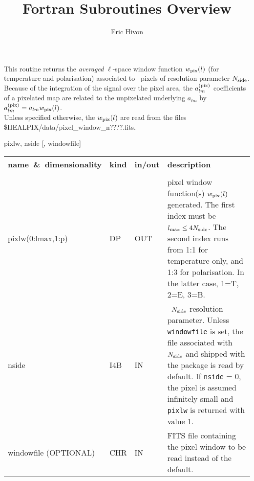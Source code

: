 
\sloppy


\title{\healpix Fortran Subroutines Overview}
 \section[pixel\_window]{ }
\label{sub:pixel_window}
\author{Eric Hivon}

\newcommand{\wpix}{w_{\rm pix}(\ell)}
\newcommand{\alm}{a_{lm}}
\newcommand{\almpix}{a_{lm}^{\rm (pix)}}

\begin{facility}
{This routine returns the {\em averaged} $\ell$-space window function $\wpix$ (for temperature and
  polarisation) associated to \healpix\
  pixels of resolution parameter ${N_{\rm side}}$. Because of the integration of the
signal over the
pixel area, the $\almpix$ coefficients of a pixelated map
are related to the unpixelated underlying $\alm$ by $\almpix = \alm \wpix$.\\
Unless specified otherwise, the $\wpix$ are read from the files
  \$HEALPIX/data/pixel\_window\_n????.fits.}
{\modAlmTools}
\end{facility}

\begin{f90format}
{pixlw, nside [, windowfile]}
\end{f90format}

\begin{arguments}
{
\begin{tabular}{p{0.30\hsize} p{0.05\hsize} p{0.05\hsize} p{0.50\hsize}} \hline  
\textbf{name~\&~dimensionality} & \textbf{kind} & \textbf{in/out} & \textbf{description} \\ \hline
                   &   &   &                           \\ %
pixlw(0:lmax,1:p) & DP & OUT & pixel window function(s) $\wpix$ generated. The first index
                   must be $l_{\rm max}\leq 4{N_{\rm side}}$. The second index runs from 1:1 for
                   temperature only, and 1:3 for polarisation. In the latter
                   case, 1=T, 2=E, 3=B.\\
nside & I4B & IN & \healpix\ ${N_{\rm side}}$ resolution parameter. Unless {\tt
                   windowfile} is set, the file associated
                   with ${N_{\rm side}}$ and shipped with the package is read by
                   default. If {\tt nside} = 0, the pixel is assumed infinitely
                   small and {\tt pixlw} is returned with value 1.\\
windowfile \hskip 2cm
(OPTIONAL) & CHR & IN & FITS file containing the pixel window to be read instead
                   of the default.
\end{tabular}
}
\end{arguments}

